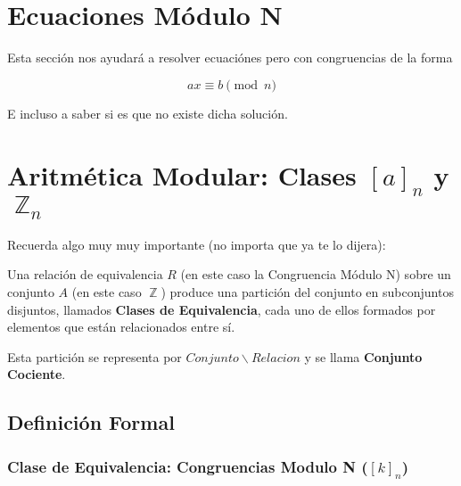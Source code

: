 \documentclass[12pt, fleqn]{report}                             %
\DeclareMathOperator \Integers  {\mathbb{Z}}                     %
\begin{document}
    \clearpage
    \section{Ecuaciones Módulo N}

        Esta sección nos ayudará a resolver ecuaciónes pero con
        congruencias de la forma

        \begin{equation}
            ax \equiv b \pmod{n}
        \end{equation}

        E incluso a saber si es que no existe dicha solución.





    \clearpage
    \section{Aritmética Modular: Clases $[a]_n$ y $\Integers_n$}

        Recuerda algo muy muy importante (no importa que ya te lo dijera):

        Una relación de equivalencia $R$ (en este caso la Congruencia Módulo N)
        sobre un conjunto $A$ (en este caso $\Integers$) produce una partición
        del conjunto en subconjuntos disjuntos, llamados \textbf{Clases de
        Equivalencia}, cada uno de ellos formados por elementos que están
        relacionados entre sí.

        Esta partición se representa por $Conjunto \backslash Relacion$ y se llama
        \textbf{Conjunto Cociente}.


        \subsection*{Definición Formal}

            \subsubsection*{Clase de Equivalencia: Congruencias Modulo N ($[k]_n$)}
\end{document}
